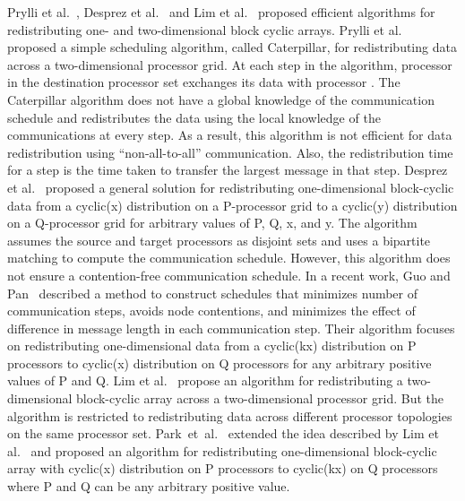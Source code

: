 \documentclass[letterpaper]{llncs}
\begin{document}
\vspace{-0.02in}
Prylli et al.~\cite{prylli}, Desprez et al.~\cite{desprez98scheduling} and
Lim et al.~\cite{Lim97}
proposed efficient algorithms for redistributing one- and two-dimensional block cyclic
arrays.
Prylli et al.~\cite{prylli} proposed a simple scheduling algorithm, called Caterpillar,
for redistributing data across a two-dimensional processor grid.
At each step  in the algorithm, processor  in the destination
processor set exchanges its data
with processor .
The Caterpillar algorithm does not have a global knowledge of the communication schedule
and redistributes the data using the local knowledge of the communications at every step.
As a result, this algorithm is not efficient for data redistribution using ``non-all-to-all''
communication. Also, the redistribution time for a step is the time taken to transfer the
largest message in that step.
Desprez et al.~\cite{desprez98scheduling} proposed a general solution for redistributing
one-dimensional block-cyclic data from a cyclic(x) distribution
on a P-processor grid to a cyclic(y) distribution on a Q-processor grid for arbitrary values of P, Q, x, and y.
The algorithm assumes the source and target processors as
disjoint sets and uses a bipartite matching to compute the communication schedule. However, this algorithm does not ensure a contention-free communication schedule.
In a recent work, Guo and Pan~\cite{Guo} described a method to construct schedules that minimizes number of communication steps, avoids node contentions, and minimizes the effect of difference in message length in each communication step.
Their algorithm focuses on redistributing one-dimensional data from a cyclic(kx) distribution on P processors to cyclic(x) distribution on Q
processors for any arbitrary positive values of P and Q. 
Lim et al.~\cite{Lim97} propose an algorithm for
redistributing a two-dimensional block-cyclic array across a two-dimensional processor grid. But the algorithm  is restricted to redistributing data across
different processor topologies on the same processor set.
Park~et~al.~\cite{park} extended the idea described by Lim et al.~\cite{Lim97} and proposed an algorithm for redistributing one-dimensional block-cyclic array with cyclic(x)
distribution on P processors to cyclic(kx) on Q processors where P and Q  can be any arbitrary positive value.
\end{document}
